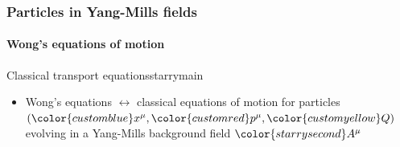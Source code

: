 \documentclass[aspectratio=169,11pt,usenames,dvipsnames]{beamer}
\begin{document}
\begin{frame}
    \frametitle{Particles in Yang-Mills fields}
    \framesubtitle{Wong's equations of motion}
   \begin{center}
    \begin{custombox2}{Classical transport equations}{starrymain}
        \small
        \begin{varwidth}{0.68\textwidth}
        \begin{itemize}\itemsep0em 
            \item Wong's equations $\leftrightarrow$ classical equations of motion for particles\\
            $({\color{customblue}x^\mu},{\color{customred}p^\mu},{\color{customyellow}Q})$ evolving in a Yang-Mills background field ${\color{starrysecond}A^\mu}$
        \end{itemize}
        \end{varwidth}
    \end{custombox2}


\end{center}
\end{frame}
\end{document}
